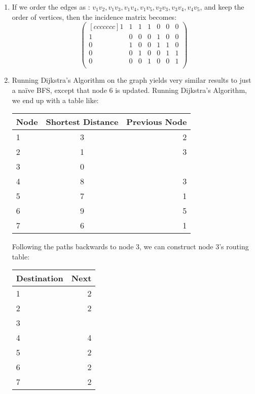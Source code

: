 \begin{enumerate}
  \item If we order the edges as : $v_1v_2, v_1v_3, v_1v_4, v_1v_5, v_2v_3, v_3v_4, v_4v_5$, and keep the order of vertices, then the incidence matrix becomes:
    $$
      \begin{pmatrix}[ccccccc]
        1 & 1 & 1 & 1 & 0 & 0 & 0\\
        1 & 0 & 0 & 0 & 1 & 0 & 0\\
        0 & 1 & 0 & 0 & 1 & 1 & 0\\
        0 & 0 & 1 & 0 & 0 & 1 & 1\\
        0 & 0 & 0 & 1 & 0 & 0 & 1\\
      \end{pmatrix}
    $$

  \item Running Dijkstra's Algorithm on the graph yields very similar results to just a naïve BFS, except that node 6 is updated. Running Dijkstra's Algorithm, we end up with a table like:
    \begin{center}
      \begin{tabular}{ l | c | r }
        Node & Shortest Distance & Previous Node\\
        \hline
        1 & 3 & 2 \\
        2 & 1 & 3 \\
        3 & 0 &   \\
        4 & 8 & 3 \\
        5 & 7 & 1 \\
        6 & 9 & 5 \\
        7 & 6 & 1 \\
      \end{tabular}
    \end{center}
    Following the paths backwards to node 3, we can construct node 3's routing table:
    \begin{center}
      \begin{tabular}{ l | r}
        Destination & Next\\
        \hline
        1 & 2 \\
        2 & 2 \\
        3 &   \\
        4 & 4 \\
        5 & 2 \\
        6 & 2 \\
        7 & 2 \\
      \end{tabular}
    \end{center}
    

\end{enumerate}
